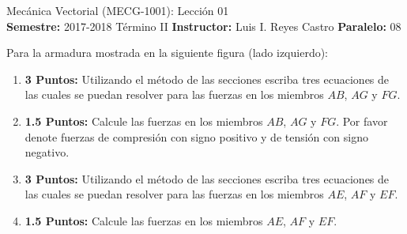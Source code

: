 \documentclass[ a4paper, twoside, 11pt]{article}
\newcommand{\numero}{01}
\begin{document}
\allowdisplaybreaks

\begin{center}
\Large Mec\'anica Vectorial (MECG-1001): Lecci\'on \numero \\[2ex]
\small \textbf{Semestre:} 2017-2018 T\'ermino II \qquad
\textbf{Instructor:} Luis I. Reyes Castro \qquad
\textbf{Paralelo:} 08
\end{center}
\fullskip

\begin{problem}
Para la armadura mostrada en la siguiente figura (lado izquierdo):
\begin{enumerate}[label=\textbf{\alph*)}]
\item \textbf{3 Puntos:} Utilizando el m\'etodo de las secciones escriba tres ecuaciones de las cuales se puedan resolver para las fuerzas en los miembros $AB$, $AG$ y $FG$. 
\item \textbf{1.5 Puntos:} Calcule las fuerzas en los miembros $AB$, $AG$ y $FG$. Por favor denote fuerzas de compresi\'on con signo positivo y de tensi\'on con signo negativo. 
\item \textbf{3 Puntos:} Utilizando el m\'etodo de las secciones escriba tres ecuaciones de las cuales se puedan resolver para las fuerzas en los miembros $AE$, $AF$ y $EF$. 
\item \textbf{1.5 Puntos:} Calcule las fuerzas en los miembros $AE$, $AF$ y $EF$. 
\end{enumerate}

\end{problem}
\fullskip
\end{document}
